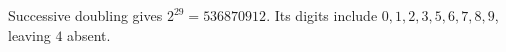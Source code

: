 Successive doubling gives $2^{29}=536870912$. Its digits include $0,1,2,3,5,6,7,8,9$, leaving $\boxed4$ absent.
